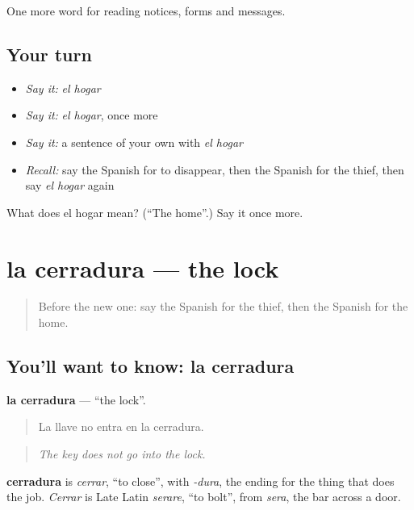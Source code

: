 \begin{grammarlens}[title={What you've built}]
One more word for reading notices, forms and messages.
\end{grammarlens}

\subsection*{Your turn}
\begin{itemize}
\raggedright
  \item \emph{Say it:} \emph{el hogar}
  \item \emph{Say it:} \emph{el hogar}, once more
  \item \emph{Say it:} a sentence of your own with \emph{el hogar}
  \item \emph{Recall:} say the Spanish for to disappear, then the Spanish for the thief, then say \emph{el hogar} again
\end{itemize}

\begin{tcolorbox}[breakable,colback=teal!4,colframe=teal!35!black,title={Before you move on}]
What does el hogar mean? (\textquotedblleft{}The home\textquotedblright{}.) Say it once more.
\end{tcolorbox}
\section[la cerradura]{la cerradura — the lock}

\label{lesson:ES-C496-cerradura}



\begin{quote}
Before the new one: say the Spanish for the thief, then the Spanish for the home.
\end{quote}

\subsection*{You'll want to know: la cerradura}
\textbf{la cerradura} — \textquotedblleft{}the lock\textquotedblright{}.

\begin{quote}
La llave no entra en la cerradura.
\end{quote}

\begin{quote}
\emph{The key does not go into the lock.}
\end{quote}

\begin{cousinweb}
\textbf{cerradura} is \emph{cerrar}, \textquotedblleft{}to close\textquotedblright{}, with \emph{-dura}, the ending for the thing that does the job. \emph{Cerrar} is Late Latin \emph{serare}, \textquotedblleft{}to bolt\textquotedblright{}, from \emph{sera}, the bar across a door.
\end{cousinweb}

